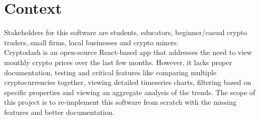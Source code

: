 \documentclass[12pt,fleqn]{article}
\begin{document}
\section{Context}
Stakeholders for this software are students, educators, beginner/casual crypto traders, small firms, local businesses and crypto miners. \\
\newline
Cryptodash is an open-source React-based app that addresses the need to view monthly crypto prices over the last few months. However, it lacks proper documentation, testing and critical features like comparing multiple cryptocurrencies together, viewing detailed timeseries charts, filtering based on specific properties and viewing an aggregate analysis of the trends. The scope of this project is to re-implement this software from scratch with the missing features and better documentation.

 
\end{document}
